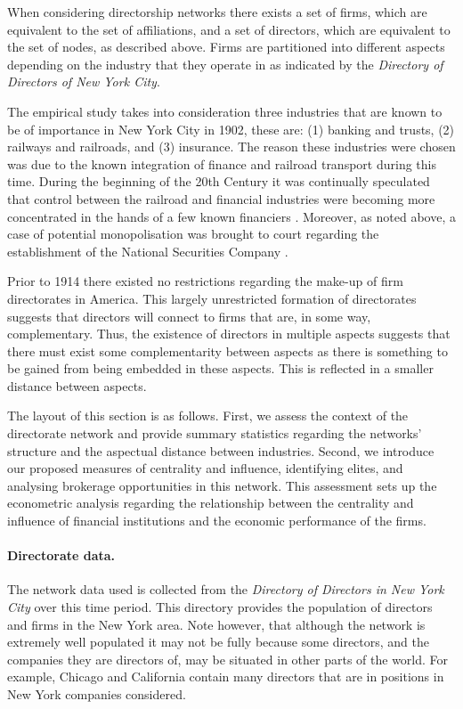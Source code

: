 When considering directorship networks there exists a set of firms, which are equivalent to the set of affiliations, and a set of directors, which are equivalent to the set of nodes, as described above. Firms are partitioned into different aspects depending on the industry that they operate in as indicated by the \emph{Directory of Directors of New York City}.

The empirical study takes into consideration three industries that are known to be of importance in New York City in 1902, these are: (1) banking and trusts, (2) railways and railroads, and (3) insurance. The reason these industries were chosen was due to the known integration of finance and railroad transport during this time. During the beginning of the 20th Century it was continually speculated that control between the railroad and financial industries were becoming more concentrated in the hands of a few known financiers \citep{NYT1912FiveMen}. Moreover, as noted above, a case of potential monopolisation was brought to court regarding the establishment of the National Securities Company \citep{NYT1902NorthernSecuritiesCo}.

Prior to 1914 there existed no restrictions regarding the make-up of firm directorates in America. This largely unrestricted formation of directorates suggests that directors will connect to firms that are, in some way, complementary. Thus, the existence of directors in multiple aspects suggests that there must exist some complementarity between aspects as there is something to be gained from being embedded in these aspects. This is reflected in a smaller distance between aspects.

 
The layout of this section is as follows. First, we assess the context of the directorate network and provide summary statistics regarding the networks' structure and the aspectual distance between industries. Second, we introduce our proposed measures of centrality and influence, identifying elites, and analysing brokerage opportunities in this network. This assessment sets up the econometric analysis regarding the relationship between the centrality and influence of financial institutions and the economic performance of the firms.

\paragraph{Directorate data.}

The network data used is collected from the \emph{Directory of Directors in New York City} over this time period. This directory provides the population of directors and firms in the New York area. Note however, that although the network is extremely well populated it may not be fully because some directors, and the companies they are directors of, may be situated in other parts of the world. For example, Chicago and California contain many directors that are in positions in New York companies considered.

